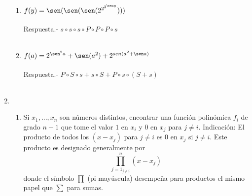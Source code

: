 \begin{enumerate}[\bfseries 1.]
\begin{enumerate}[\bfseries (i)]
	    \item $f(y) = \sen (\sen (\sen (2^{2^{2^{\sen y}}})))$\\\\
	    Respuesta.- \; $s \circ s \circ s \circ P \circ P \circ P \circ s$\\\\

	    \item $f(a)= 2^{\sen^2 a} +  \sen(a^2) + 2^{sen(a^2 + \sen a)}$\\\\
	    Respuesta.- \; $P \circ S \circ s  + s \circ S + P \circ s \circ (S + s)$\\\\

	\end{enumerate}

	\item 
	\begin{enumerate}[\bfseries (a)]

	    \item Si $x_1, ... , x_n$ son números distintos, encontrar una función polinómica $f_i$ de grado $n-1$ que tome el valor $1$ en $x_i$ y $0$ en $x_j$ para $j \neq i.$ Indicación: El producto de todos los $(x-x_j)$ para $j \neq i$ es $0$ en $x_j$ si $j \neq i.$ Este producto es designado generalmente por $$\prod\limits_{j=1_{j \neq i}}^n (x-x_j)$$ donde el símbolo $\prod$ (pi mayúscula) desempeña para productos el mismo papel que $\sum$ para sumas.\\\\


\end{enumerate}
\end{enumerate}

